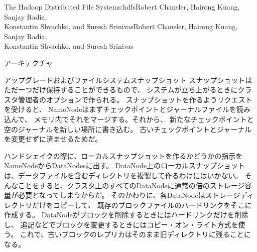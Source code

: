 \begin{aosachaptertoc}{The Hadoop Distributed File System}{s:hdfs}{Robert Chansler, Hairong Kuang, Sanjay Radia, \\ Konstantin Shvachko, and Suresh Srinivas}{Robert Chansler, Hairong Kuang, Sanjay Radia, \\ \hspace*{0.9cm} Konstantin Shvachko, and Suresh Srinivas}
\begin{aosasect1}{アーキテクチャ}
\begin{aosasect2}{アップグレードおよびファイルシステムスナップショット}
スナップショットはただ一つだけ保持することができるもので、
システムが立ち上がるときにクラスタ管理者のオプションで作られる。
スナップショットを作るようリクエストを受けると、
NameNodeはまずチェックポイントとジャーナルファイルを読み込んで、
メモリ内でそれをマージする。それから、
新たなチェックポイントと空のジャーナルを新しい場所に書き込む。
古いチェックポイントとジャーナルを変更せずに済ませるためだ。

ハンドシェイクの際に、ローカルスナップショットを作るかどうかの指示をNameNodeからDataNodesに出す。
DataNode上のローカルスナップショットは、データファイルを含むディレクトリを複製して作るわけにはいかない。
そんなことをすると、クラスタ上のすべてのDataNodeに通常の倍のストレージ容量が必要となってしまうからだ。
そのかわりに、各DataNodeはストレージディレクトリだけをコピーして、
既存のブロックファイルのハードリンクをそこに作成する。
DataNodeがブロックを削除するときにはハードリンクだけを削除し、
追記などでブロックを変更するときにはコピー・オン・ライト方式を使う。
これで、古いブロックのレプリカはそのまま旧ディレクトリに残ることになる。


\end{aosasect2}
\end{aosasect1}
\end{aosachaptertoc}
